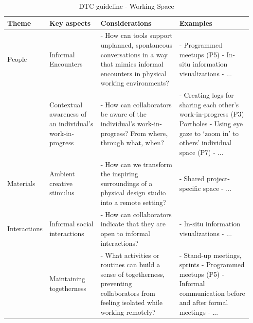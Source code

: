 \documentclass[11pt]{article}
\begin{document}
\clearpage
\begin{table}[ht]
\centering
\small
\caption{DTC guideline - Working Space}
\begin{tabular}{|l|p{3.2cm}|p{4.5cm}|p{4.5cm}|}
\hline
\textbf{Theme} & \textbf{Key aspects} & \textbf{Considerations} & \textbf{Examples} \\
\hline

People & Informal Encounters 
& - How can tools support unplanned, spontaneous conversations in a way that mimics informal encounters in physical working environments? \newline {~}
& - Programmed meetups (P5) \newline
- In-situ information visualizations\cite{tang2001awarenex,monastero2018traces} \newline
- ... \newline {~}\\

{~} & Contextual awareness of an individual’s work-in-progress 
& - How can collaborators be aware of the individual’s work-in-progress? \newline
From where, through what, when?
& - Creating logs for sharing each other’s work-in-progress (P3) \newline
Portholes\cite{dourish1992portholes} \newline
- Using eye gaze to ‘zoom in’ to others’ individual space (P7) \newline
- ... \newline {~}\\
\hline

Materials & Ambient creative stimulus 
& - How can we transform the inspiring surroundings of a physical design studio into a remote setting? \newline {~}
& - Shared project-specific space \newline
- ... \newline {~}\\
\hline

Interactions & Informal social interactions 
& - How can collaborators indicate that they are open to informal interactions?
& - In-situ information visualizations\cite{tang2001awarenex,monastero2018traces} \newline
- ... \newline {~}\\


{~} & Maintaining togetherness 
& - What activities or routines can build a sense of togetherness, preventing collaborators from feeling isolated while working remotely?
& - Stand-up meetings, sprints\cite{stray2016daily} \newline
- Programmed meetups (P5) \newline
- Informal communication before and after formal meetings\cite{hu2022fluidmeet} \newline
- ... \newline {~}\\


\end{tabular}
\end{table}
\end{document}
